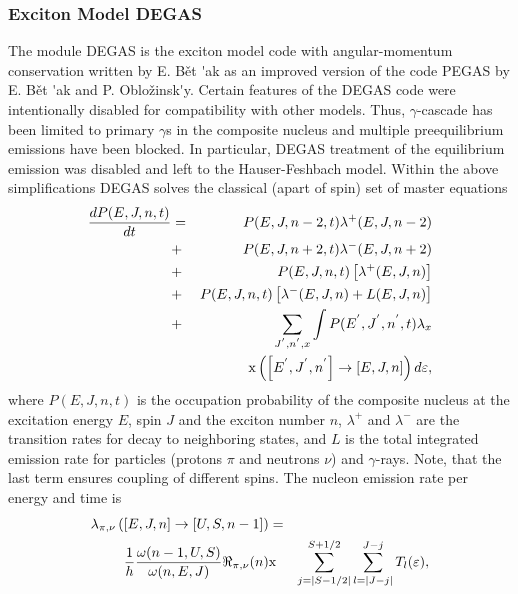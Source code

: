 
\subsubsection{Exciton Model DEGAS\label{DEGAS}}

The module DEGAS%
 is the exciton model code with angular-momentum conservation
written by E. B\v{e}t%
\'{ }ak as an improved version of the code PEGAS \cite{Degas} by E. B\v{e}t%
\'{ }ak and P. Oblo\v{z}insk\'{ }y. Certain features of the DEGAS code were
intentionally disabled for compatibility with other models.
Thus, $\gamma $-cascade has been limited to primary $\gamma $s in the
composite nucleus and multiple preequilibrium emissions have been blocked.
In particular, DEGAS treatment of the equilibrium emission was disabled and
left to the Hauser-Feshbach%
 model. %
Within the above simplifications DEGAS%
 solves the classical (apart of spin) set of master equations
\begin{eqnarray}
\frac{dP(E,J,n,t)}{dt} &=&P(E,J,n-2,t)\lambda ^{+}(E,J,n-2)  \notag \\
&+&P(E,J,n+2,t)\lambda ^{-}(E,J,n+2)  \notag \\
&+&P(E,J,n,t)\left[ \lambda ^{+}(E,J,n)\right]  \notag \\
&+&P(E,J,n,t)\left[ \lambda ^{-}(E,J,n)+L(E,J,n)\right]  \notag
\label{mastereq} \\
&+&\sum_{J^{^{\prime }},n^{^{\prime }},x}\int P(E^{^{\prime }},J^{^{\prime
}},n^{^{\prime }},t)\lambda _{x}  \notag \\
&&\text{x}\left( \left[ E^{^{\prime }},J^{^{\prime }},n^{^{\prime }}\right]
\rightarrow \left[ E,J,n\right] \right) d\varepsilon ,
\end{eqnarray}%
\noindent where $P(E,J,n,t)$ is the occupation probability of the composite
nucleus at the excitation energy $E$, spin $J$ and the exciton number $n$, $%
\lambda ^{+}$ and $\lambda ^{-}$ are the transition rates for decay to
neighboring states, and $L$ is the total integrated emission rate for
particles (protons $\pi $ and neutrons $\nu $) and $\gamma $-rays. Note,
that the last term ensures coupling of different spins. The nucleon emission
rate per energy and time is
\begin{eqnarray}
\lambda _{\pi ,\nu }\left( \left[ E,J,n\right] \rightarrow \left[ U,S,n-1%
\right] \right) &=& \\
\frac{1}{h}\frac{\omega (n-1,U,S)}{\omega (n,E,J)}\Re _{\pi ,\nu }(n) &\text{%
x}&\sum_{j=\mid S-1/2\mid }^{S+1/2}\sum_{l=\mid J-j\mid
}^{J-j}T_{l}(\varepsilon ),  \notag
\end{eqnarray}%
